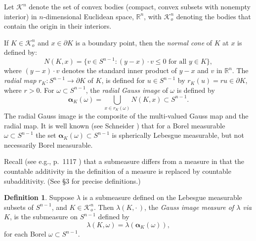 \documentclass{cpamart1}     %
\theoremstyle{definition}
\newtheorem*{definition-non}{Definition}
\theoremstyle{remark}
\newcommand{\rn}{\mathbb R^n}
\newcommand{\sn}{S^{n-1}}
\newcommand{\kn}{\mathcal K^n}
\newcommand{\kno}{\mathcal K^n_o}
\newcommand{\balpha}{\pmb{\alpha}}
\begin{document}



Let $\kn$ denote the set of convex bodies (compact, convex subsets with nonempty interior) in $n$-dimensional
Euclidean space, $\rn$, with $\kno$ denoting the bodies that contain the origin in their interiors.

If $K\in\kno$ and $x \in \partial K$ is a boundary point,
then the {\it normal cone} of $K$ at $x$ is defined by:
\[
N(K,x)=\{v\in\sn: \text{$(y-x)\cdot v \le 0$ for all $y\in K$}\},
\]
where $(y-x)\cdot v$ denotes the standard inner product of $y-x$ and $v$ in $\rn$.
The
{\it radial map} $r_K : \sn \to \partial K$ of $K$, is defined for $u \in \sn$
by $r_K(u) =  ru \in\partial K$, where $r>0$.
For $\omega\subset\sn$, the {\it radial Gauss image} of $\omega$ is defined  by
\[
\balpha_K(\omega) = \bigcup_{x\in r_K(\omega)} N(K,x) \subset \sn.
\]
The radial Gauss image is the composite of the multi-valued Gauss map and the radial map.
It is well known (see Schneider \cite{S14}) that 
for a Borel measurable $\omega\subset\sn$ the set
$\balpha_K(\omega)\subset\sn$ is spherically Lebesgue measurable, but not necessarily Borel measurable.

Recall (see e.g., \cite{Kalton} p.\ 1117 ) that a submeasure differs from a measure in that the countable additivity in the definition of a measure is replaced by countable subadditivity. (See \S 3 for precise definitions.)

\begin{definition-non}
Suppose $\lambda$ is a submeasure defined on the Lebesgue measurable subsets of $\sn$, and $K\in\kno$. Then $\lambda(K,\cdot\,)$,
the {\it Gauss image measure of $\lambda$ via $K$},  is the submeasure on $\sn$ defined by
\[
\lambda(K,\omega)=\lambda(\balpha_K(\omega)),
\]
for each Borel $\omega\subset\sn$.
\end{definition-non}
\end{document}
